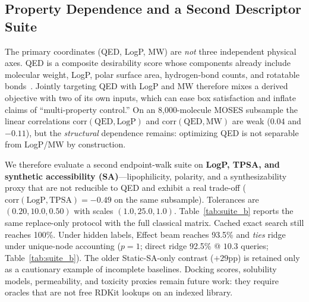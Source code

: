 \subsection{Property Dependence and a Second Descriptor Suite}
\label{sec:suite_b}

The primary coordinates (QED, LogP, MW) are \emph{not} three independent physical axes. QED is a composite desirability score whose components already include molecular weight, LogP, polar surface area, hydrogen-bond counts, and rotatable bonds~\citep{bickerton2012qed}. Jointly targeting QED with LogP and MW therefore mixes a derived objective with two of its own inputs, which can ease box satisfaction and inflate claims of ``multi-property control.'' On an 8{,}000-molecule MOSES subsample the linear correlations $\mathrm{corr}(\mathrm{QED},\mathrm{LogP})$ and $\mathrm{corr}(\mathrm{QED},\mathrm{MW})$ are weak ($0.04$ and $-0.11$), but the \emph{structural} dependence remains: optimizing QED is not separable from LogP/MW by construction.

We therefore evaluate a second endpoint-walk suite on \textbf{LogP, TPSA, and synthetic accessibility (SA)}---lipophilicity, polarity, and a synthesizability proxy that are not reducible to QED and exhibit a real trade-off ($\mathrm{corr}(\mathrm{LogP},\mathrm{TPSA}){=}-0.49$ on the same subsample). Tolerances are $(0.20,10.0,0.50)$ with scales $(1.0,25.0,1.0)$. Table~\ref{tab:suite_b} reports the same replace-only protocol with the full classical matrix. Cached exact search still reaches 100\%. Under hidden labels, Effect beam reaches 93.5\% and \emph{ties} ridge under unique-node accounting ($p{=}1$; direct ridge 92.5\% @ $10.3$ queries; Table~\ref{tab:suite_b}). The older Static-SA-only contrast ($+29$pp) is retained only as a cautionary example of incomplete baselines. Docking scores, solubility models, permeability, and toxicity proxies remain future work: they require oracles that are not free RDKit lookups on an indexed library.

